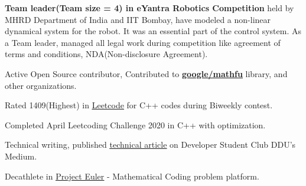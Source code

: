 \begin{cventries}
  \cventry
     {} %
     {} %
     {} %
     {} %
    {
    \begin{cvitems} %
         \item {\textbf{Team leader(Team size = 4) in eYantra Robotics Competition} held by MHRD Department of India and IIT Bombay, have modeled a non-linear dynamical system for the robot. It was an essential  part of the control system. As a Team leader, managed all legal work during competition like agreement of terms and conditions, NDA(Non-disclosure Agreement).}
         \vspace{1.5mm}
         \item { Active Open Source contributor, Contributed to \textbf{\underline{\href{https://github.com/google/mathfu/pull/44}{google/mathfu}}} library, and other organizations.}
         \vspace{1.5mm}
         \item{Rated 1409(Highest) in \underline{\href{https://leetcode.com/bagadahardik2000/}{Leetcode}} for C++ codes during Biweekly contest.}
         \vspace{1.5mm}
         \item{Completed April Leetcoding Challenge 2020 in C++ with optimization.}
         \vspace{1.5mm}
         \item{Technical writing, published  \underline{\href{https://medium.com/dscddu/world-of-gis-and-its-applications-65e64ecd2396}{technical article}} on Developer Student Club DDU's Medium.}
         \vspace{1.5mm}
         \item{Decathlete  in \underline{\href{https://projecteuler.net/}{Project Euler}} - Mathematical Coding problem platform.}
    \end{cvitems}
  }
\end{cventries}